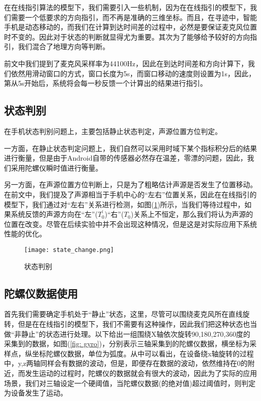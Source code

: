 \documentclass[winfonts]{njuthesis}
\begin{document}
			在在线指引算法的模型下，我们需要引入一些机制，因为在在线指引的模型下，我们需要一个低要求的方向指引，而不再是准确的三维坐标。而且，在寻迹中，智能手机是动态移动的，而我们在计算到达时间差的过程中，必然是要保证麦克风位置时不变的。因此对于状态的判断就显得尤为重要。其次为了能够给予较好的方向指引，我们混合了地理方向等判断。
			
			前文中我们提到了麦克风采样率为44100Hz，因此在到达时间差和方向计算下，我们依然用滑动窗口的方式，窗口长度为5s，而窗口移动的速度则设置为1s，因此，第从5s开始后，系统将会每一秒反馈一个计算出的结果进行指引。
			
		\subsection{状态判别}
		
			在手机状态判别问题上，主要包括静止状态判定，声源位置方位判定。
			
			一方面，在静止状态判定问题上，我们自然可以采用时域下某个指标积分后的结果进行衡量，但是由于Android自带的传感器必然存在温差，零漂的问题，因此，我们采用陀螺仪瞬时值进行衡量。
			
			另一方面，在声源位置方位判断上，只是为了粗略估计声源是否发生了位置移动。在前文中，我们提及了声源相当于手机中心的“左右”位置关系，因此在在线指引的模型下，我们通过对“左右”关系进行检测，如图(\ref{fig: state-change})所示，当我们等待过程中，如果系统反馈的声源方向在“左”($T_0^{'}$)“右”($T_0$)关系上不恒定，那么我们将认为声源的位置在改变。尽管在后续实验中并不会出现这种情况，但是这是对实际应用下系统性能的优化。
			
			\begin{figure}[H]
				\centering
				\texttt{[image: state\_change.png]} 
				\caption{{状态判别}}
				\label{fig: state-change}
			\end{figure}	
						
		\subsection{陀螺仪数据使用}	
		
			首先我们需要确定手机处于“静止”状态，这里，尽管可以围绕麦克风所在直线旋转，但是在在线指引的模型下，我们不需要有这种操作，因此我们把这种状态也当做“非静止”的状态进行处理。以下给出一组围绕X轴依次旋转90,180,270,360度的采集到的数据，如图(\ref{fig: gyro})，分别表示三轴采集到的陀螺仪数据，横坐标为采样点，纵坐标陀螺仪数据，单位为弧度。从中可以看出，在设备绕x轴旋转的过程中，y,z两轴同样会有数据的波动，但是，即便存在数据的波动，依然维持在0的附近，而发生运动的过程时，陀螺仪的数据就会有很大的波动，因此为了实际的应用场景，我们对三轴设定一个硬阈值，当陀螺仪数据(的绝对值)超过阈值时，则判定为设备发生了运动。
		
\end{document}

